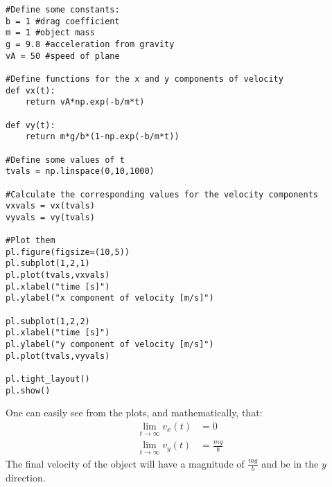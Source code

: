 \begin{solution}
\begin{parts}
\begin{verbatim}
#Define some constants:
b = 1 #drag coefficient
m = 1 #object mass
g = 9.8 #acceleration from gravity
vA = 50 #speed of plane

#Define functions for the x and y components of velocity
def vx(t):
    return vA*np.exp(-b/m*t)

def vy(t):
    return m*g/b*(1-np.exp(-b/m*t))

#Define some values of t
tvals = np.linspace(0,10,1000)

#Calculate the corresponding values for the velocity components
vxvals = vx(tvals)
vyvals = vy(tvals)

#Plot them
pl.figure(figsize=(10,5))
pl.subplot(1,2,1)
pl.plot(tvals,vxvals)
pl.xlabel("time [s]")
pl.ylabel("x component of velocity [m/s]")

pl.subplot(1,2,2)
pl.xlabel("time [s]")
pl.ylabel("y component of velocity [m/s]")
pl.plot(tvals,vyvals)

pl.tight_layout()
pl.show()
\end{verbatim}

\item One can easily see from the plots, and mathematically, that:
\begin{align*}
\lim_{t\to\infty}v_x(t)&=0\\
\lim_{t\to\infty}v_y(t)&=\frac{mg}{b}
\end{align*}
The final velocity of the object will have a magnitude of $\frac{mg}{b}$ and be in the $y$ direction.
\end{parts}
\end{solution}

